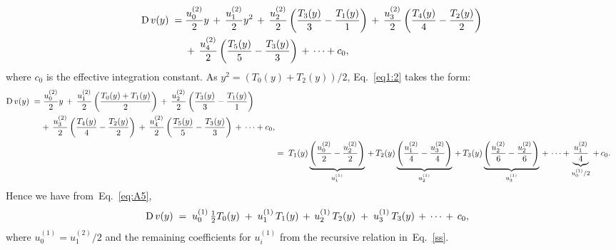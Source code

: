 \documentclass[%
secnumarabic,%
 amssymb, amsmath,%
 aps,prf,superscriptaddress,longbibliography
frontmatterverbose,
]{revtex4-2}
\begin{document}
\begin{align}\label{eq1:2}
  \begin{split}
    \mathrm D\,v(y) \;=&\; \frac{u^{(2)}_0}{2}y \,+ \, \frac{u^{(2)}_1}{2}y^2 \,+\,\frac{u^{(2)}_2}{2}\left(\frac{T_3(y)}{3} - \frac{T_1(y)}{1}\right) \,+\,\frac{u^{(2)}_3}{2}\left(\frac{T_4(y)}{4} - \frac{T_2(y)}{2}\right)\,\\
    &\;+\,\frac{u^{(2)}_4}{2}\left(\frac{T_5(y)}{5} - \frac{T_3(y)}{3}\right)\,+\, \cdots + c_0,
  \end{split}
\end{align}
where $c_0$ is the effective integration constant.
As $y^2 = (T_0(y)+T_2(y))/2$, Eq.~\eqref{eq1:2} takes the form:
\begin{align}
  \begin{split}
  \mathrm D\,v(y)\;=&\; \frac{u^{(2)}_0}{2}y \,+\, \frac{u^{(2)}_1}{2} \left(\frac{T_0(y) + T_1(y)}{2}\right) \,+\,\frac{u^{(2)}_2}{2}\left(\frac{T_3(y)}{3} - \frac{T_1(y)}{1}\right) \,\\&+\,\frac{u^{(2)}_3}{2}\left(\frac{T_4(y)}{4} - \frac{T_2(y)}{2}\right)\,+\,\frac{u^{(2)}_4}{2}\left(\frac{T_5(y)}{5} - \frac{T_3(y)}{3}\right)\,+\, \cdots + c_0,
\end{split} \\
  &=\; T_1(y)\underbrace{\left(\frac{u^{(2)}_0}{2} - \frac{u^{(2)}_2}{2}\right)}_{u^{(1)}_1} \,+\,T_2(y)\underbrace{\left(\frac{u^{(2)}_1}{4} - \frac{u^{(2)}_3}{4} \right)}_{u^{(1)}_2} \,+\,T_3(y)\underbrace{\left(\frac{u^{(2)}_2}{6} - \frac{u^{(2)}_2}{6}\right)}_{u^{(1)}_3} \,+\,\cdots + \underbrace{\frac{u^{(2)}_1}{4}}_{u^{(1)}_0/2} \,+\, c_0.\label{eq:A5}
\end{align}
Hence we have from~Eq.~\eqref{eq:A5},
\begin{align}
  \mathrm D\, v(y) \;&=\; u^{(1)}_0 \,\tfrac{1}{2}T_0(y) \;+\; u^{(1)}_1\,T_1(y) \,+\, u^{(1)}_2\,T_2(y) \;+\; u^{(1)}_3\,T_3(y) \,+\, \cdots \,+\, c_0,
\end{align}
where $u^{(1)}_0 = u^{(2)}_1/2$ and the remaining coefficients for $u^{(1)}_i$ from the recursive relation in~Eq.~\eqref{ss}.
\newpage\noindent


\singlespacing

\end{document}
